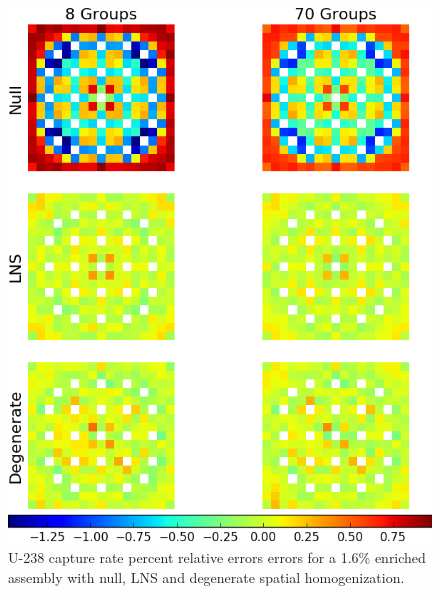 \begin{figure}[h!]
\centering
\includegraphics[width=\linewidth]{figures/patterns/lns/assm-16/capt-err}
\vspace{2mm}
\caption[U-238 capture rate errors for a 1.6\% enriched assembly]{U-238 capture rate percent relative errors errors for a 1.6\% enriched assembly with null, \ac{LNS} and degenerate spatial homogenization.}
\label{fig:chap9-assm-1.6-lns-capt-err}
\end{figure}

\clearpage

